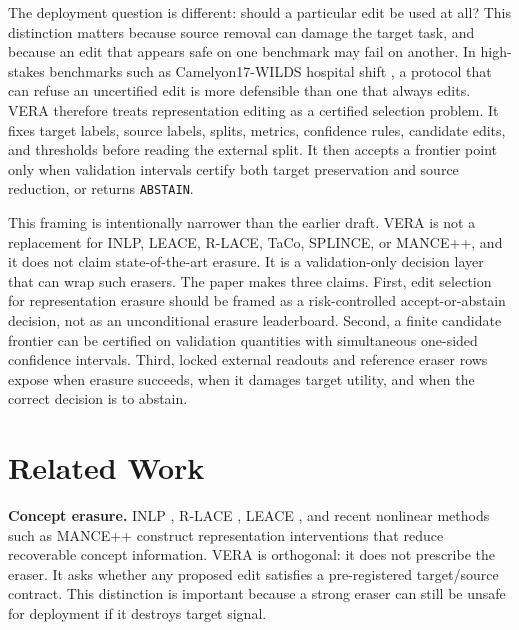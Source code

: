\documentclass[letterpaper]{article}
\begin{document}
The deployment question is different: should a particular edit be used at all?
This distinction matters because source removal can damage the target task,
and because an edit that appears safe on one benchmark may fail on another.
In high-stakes benchmarks such as Camelyon17-WILDS hospital shift
\citep{koh2021wilds}, a protocol that can refuse an uncertified edit is more
defensible than one that always edits. VERA therefore treats representation
editing as a certified selection problem. It fixes target labels, source
labels, splits, metrics, confidence rules, candidate edits, and thresholds
before reading the external split. It then accepts a frontier point only when
validation intervals certify both target preservation and source reduction, or
returns \texttt{ABSTAIN}.

This framing is intentionally narrower than the earlier draft. VERA is not a
replacement for INLP, LEACE, R-LACE, TaCo, SPLINCE, or MANCE++, and it does not
claim state-of-the-art erasure. It is a validation-only decision layer that can
wrap such erasers. The paper makes three claims. First, edit selection for
representation erasure should be framed as a risk-controlled accept-or-abstain
decision, not as an unconditional erasure leaderboard. Second, a finite
candidate frontier can be certified on validation quantities with simultaneous
one-sided confidence intervals. Third, locked external readouts and reference
eraser rows expose when erasure succeeds, when it damages target utility, and
when the correct decision is to abstain.

\section{Related Work}

\textbf{Concept erasure.} INLP \citep{ravfogel2020inlp}, R-LACE
\citep{ravfogel2022lace}, LEACE \citep{belrose2023leace}, and recent nonlinear
methods such as MANCE++ \citep{avitan2026mance} construct representation
interventions that reduce recoverable concept information. VERA is orthogonal:
it does not prescribe the eraser. It asks whether any proposed edit satisfies a
pre-registered target/source contract. This distinction is important because a
strong eraser can still be unsafe for deployment if it destroys target signal.
\end{document}
